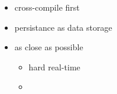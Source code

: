 \label{princ}

\begin{itemize}
    \item cross-compile first
    \item persistance as data storage
    \item as close as possible
    \begin{itemize}
        \item hard real-time
        \item 
    \end{itemize}
\end{itemize}
